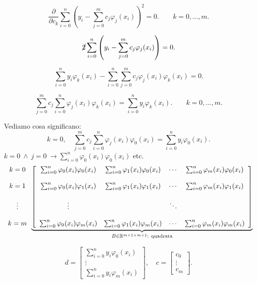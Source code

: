 \[
\frac{\partial}{\partial c_k}\sum_{i=0}^n\left(y_i - \sum_{j=0}^mc_j
\varphi_j(x_i)\right)^2 = 0. \qquad k = 0, \ldots,m.
\]

\[
\cancel{2}\sum_{i=0}^n\left(y_i - \sum_{j=0}^mc_j
\varphi_j(x_i)\right) = 0.
\]

\[
\sum_{i=0}^ny_i\varphi_k(x_i) -  \sum_{i=0}^n\sum_{j=0}^mc_j
\varphi_j(x_i)\varphi_k(x_i) = 0.
\]

\[
\sum_{j=0}^mc_j\sum_{i=0}^n\varphi_j(x_i)\varphi_k(x_i) =
\sum_{i=0}^ny_i\varphi_k(x_i). \qquad  k = 0, \ldots,m.
\]

Vediamo cosa significano:
\[
k = 0, \quad \sum_{j=0}^mc_j\sum_{i=0}^n\varphi_j(x_i)\varphi_0(x_i) =
\sum_{i=0}^ny_i\varphi_0(x_i).
\]
$k = 0\ \wedge\ j = 0 \ \longrightarrow \sum_{i=0}^n\varphi_0(x_i)
\varphi_0(x_i)$ etc.
\[
\begin{array}{c}k = 0 \\\\ k = 1 \\\\ \vdots \\\\ k = m\end{array}
\underbrace{\left[\begin{array}{cccc}
\sum_{i=0}^n\varphi_0(x_i)\varphi_0(x_i)
& \sum_{i=0}^n\varphi_1(x_i)\varphi_0(x_i) & \cdots
& \sum_{i=0}^n\varphi_m(x_i)\varphi_0(x_i) \\\\
\sum_{i=0}^n\varphi_0(x_i)\varphi_1(x_i)
& \sum_{i=0}^n\varphi_1(x_i)\varphi_1(x_i) & \cdots
& \sum_{i=0}^n\varphi_m(x_i)\varphi_1(x_i) \\\\
\vdots  & & \ddots\\\\
\sum_{i=0}^n\varphi_0(x_i)\varphi_m(x_i)
& \sum_{i=0}^n\varphi_1(x_i)\varphi_m(x_i) & \cdots
& \sum_{i=0}^n\varphi_m(x_i)\varphi_m(x_i)
\end{array}\right]}_{B \in \rr^{m+1 \times m+1}:\ \textrm{quadrata}}
\]

\[
d = \left[
\begin{array}{c}
\sum_{i=0}^ny_i\varphi_0(x_i)\\
\vdots \\
\sum_{i=0}^ny_i\varphi_m(x_i)
\end{array}
\right], \quad
c = \left[
\begin{array}{c}
c_0 \\
\vdots \\
c_m
\end{array}
\right].
\]

